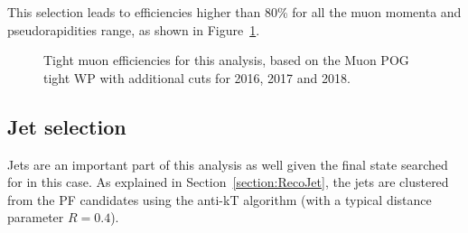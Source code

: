 \documentclass[a4paper, 10pt, openright]{report}
\begin{document}
This selection leads to efficiencies higher than 80\% for all the muon momenta and pseudorapidities range, as shown in Figure~\ref{fig:MuonEff}.

\begin{figure}[htbp]
\centering
{}
\caption{Tight muon efficiencies for this analysis, based on the Muon \ac{POG} tight \ac{WP} with additional cuts for 2016, 2017 and 2018.}
\label{fig:MuonEff}
\end{figure}

\subsection{Jet selection} \label{section:JetSel}

Jets are an important part of this analysis as well given the final state searched for in this case. As explained in Section~\ref{section:RecoJet}, the jets are clustered from the \ac{PF} candidates using the anti-kT algorithm (with a typical distance parameter $R = 0.4$). 
\end{document}
